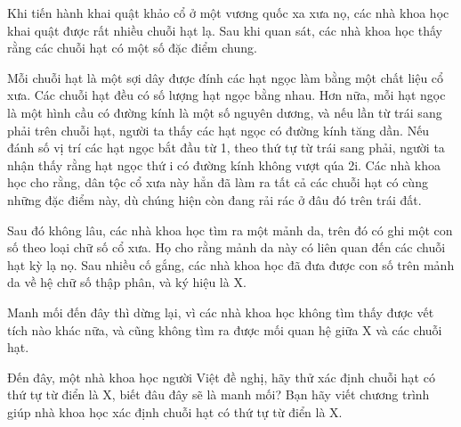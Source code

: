 Khi tiến hành khai quật khảo cổ ở một vương quốc xa xưa nọ, các nhà khoa học khai quật được rất nhiều chuỗi hạt lạ. Sau khi quan sát, các nhà khoa học thấy rằng các chuỗi hạt có một số đặc điểm chung.  

   Mỗi chuỗi hạt là một sợi dây được đính các hạt ngọc làm bằng một chất liệu cổ xưa. Các chuỗi hạt đều có số lượng hạt ngọc bằng nhau. Hơn nữa, mỗi hạt ngọc là một hình cầu có đường kính là một số nguyên dương, và nếu lần từ trái sang phải trên chuỗi hạt, người ta thấy các hạt ngọc có đường kính tăng dần. Nếu đánh số vị trí các hạt ngọc bắt đầu từ 1, theo thứ tự từ trái sang phải, người ta nhận thấy rằng hạt ngọc thứ i có đường kính không vượt qúa 2i. Các nhà khoa học cho rằng, dân tộc cổ xưa này hẳn đã làm ra tất cả các chuỗi hạt có cùng những đặc điểm này, dù chúng hiện còn đang rải rác ở đâu đó trên trái đất.  

   Sau đó không lâu, các nhà khoa học tìm ra một mảnh da, trên đó có ghi một con số theo loại chữ số cổ xưa. Họ cho rằng mảnh da này có liên quan đến các chuỗi hạt kỳ lạ nọ. Sau nhiều cố gắng, các nhà khoa học đã đưa được con số trên mảnh da về hệ chữ số thập phân, và ký hiệu là X.  

   Manh mối đến đây thì dừng lại, vì các nhà khoa học không tìm thấy được vết tích nào khác nữa, và cũng không tìm ra được mối quan hệ giữa X và các chuỗi hạt.  

   Đến đây, một nhà khoa học người Việt đề nghị, hãy thử xác định chuỗi hạt có thứ tự từ điển là X, biết đâu đây sẽ là manh mối?
Bạn hãy viết chương trình giúp nhà khoa học xác định chuỗi hạt có thứ tự từ điển là X.